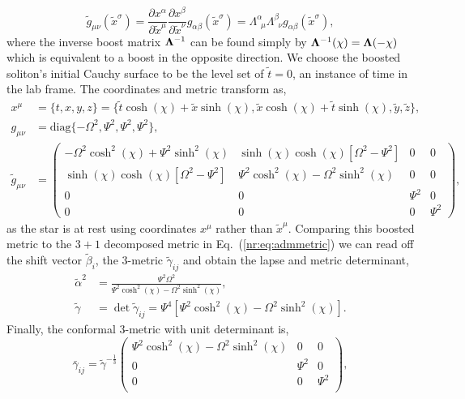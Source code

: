 \begin{equation}
\tilde{g}_{\mu\nu}(\tilde{x}^\sigma)= \frac{\partial x^\alpha}{\partial \tilde{x}^\mu}  \frac{\partial x^\beta}{\partial \tilde{x}^\nu}g_{\alpha\beta}(\tilde{x}^\sigma) = \Lambda^\alpha_{\,\,\,\mu}\Lambda^\beta_{\,\,\,\nu} g_{\alpha\beta}(\tilde{x}^\sigma),
\end{equation}
where the inverse boost matrix $\boldsymbol{\Lambda}^{-1}$ can be found simply by $\boldsymbol{\Lambda}^{-1}(\chi) = \boldsymbol{\Lambda}(-\chi)$ which is equivalent to a boost in the opposite direction.
We choose the boosted soliton's initial Cauchy surface to be the level set of $\tilde{t}=0$, an instance of time in the lab frame. The coordinates and metric transform as,
\begin{align}
 x^\mu &= \{ t,x,y,z\} = \{\tilde{t}\cosh(\chi) + \tilde{x} \sinh(\chi),\tilde{x}\cosh(\chi)+\tilde{t}\sinh(\chi),\tilde{y},\tilde{z}\} ,\\
 g_{\mu\nu} &= \mathrm{diag} \{ -\Omega^2, \Psi^2,  \Psi^2, \Psi^2\} ,\\
 \tilde{g}_{\mu\nu}&=\begin{pmatrix} -\Omega^2\cosh^2 (\chi) + \Psi^2 \sinh^2 (\chi) & \sinh(\chi)\cosh(\chi)\left[\Omega^2-\Psi^2\right] & 0& 0 \\  \sinh(\chi)\cosh(\chi)\left[\Omega^2-\Psi^2\right] & \Psi^2 \cosh^2 (\chi) - \Omega^2 \sinh^2 (\chi) & 0 & 0\\ 0 & 0&\Psi^2&0 \\ 0&0&0&\Psi^2\end{pmatrix},
 \end{align}
 as the star is at rest using coordinates $x^\mu$ rather than $\tilde{x}^\mu$.
Comparing this boosted metric to the $3+1$ decomposed metric in Eq.~(\ref{nr:eq:admmetric}) we can read off the shift vector $\tilde{\beta}_i$, the 3-metric $\tilde{\gamma}_{ij}$ and obtain the lapse and metric determinant,
\begin{align} 
\tilde{\alpha}^2 &= \frac{\Psi ^2 \Omega ^2}{\Psi ^2 \cosh ^2(\chi) -\Omega ^2 \sinh ^2(\chi) },\\ 
\tilde{\gamma} &= \det \tilde{\gamma}_{ij} = \Psi^4\left[ \Psi^2 \cosh^2 (\chi) - \Omega^2 \sinh^2(\chi)\right].
\end{align}
Finally, the conformal 3-metric with unit determinant is, 
\begin{equation} \bar{\gamma}_{ij} = \tilde{\gamma}^{-\frac{1}{3}}\left(
\begin{array}{ccc}
 \Psi ^2 \cosh ^2(\chi) -\Omega ^2 \sinh ^2(\chi)  & 0 & 0 \\
 0 & \Psi ^2 & 0 \\
 0 & 0 & \Psi ^2 \\
\end{array}
\right),\end{equation}
